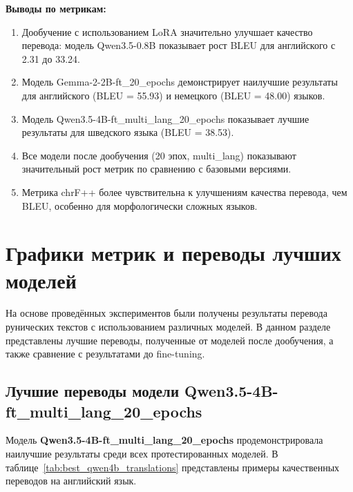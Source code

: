 \documentclass[14pt,a4paper]{extreport}
\begin{document}
\textbf{Выводы по метрикам:}
\begin{enumerate}
    \item Дообучение с использованием LoRA значительно улучшает качество перевода: модель Qwen3.5-0.8B показывает рост BLEU для английского с 2.31 до 33.24.
    \item Модель Gemma-2-2B-ft\_20\_epochs демонстрирует наилучшие результаты для английского (BLEU = 55.93) и немецкого (BLEU = 48.00) языков.
    \item Модель Qwen3.5-4B-ft\_multi\_lang\_20\_epochs показывает лучшие результаты для шведского языка (BLEU = 38.53).
    \item Все модели после дообучения (20 эпох, multi\_lang) показывают значительный рост метрик по сравнению с базовыми версиями.
    \item Метрика chrF++ более чувствительна к улучшениям качества перевода, чем BLEU, особенно для морфологически сложных языков.
\end{enumerate}

\section{Графики метрик и переводы лучших моделей}

На основе проведённых экспериментов были получены результаты перевода рунических текстов с использованием различных моделей. В данном разделе представлены лучшие переводы, полученные от моделей после дообучения, а также сравнение с результатами до fine-tuning.

\subsection{Лучшие переводы модели Qwen3.5-4B-ft\_multi\_lang\_20\_epochs}

Модель \textbf{Qwen3.5-4B-ft\_multi\_lang\_20\_epochs} продемонстрировала наилучшие результаты среди всех протестированных моделей. В таблице~\ref{tab:best_qwen4b_translations} представлены примеры качественных переводов на английский язык.
\end{document}

